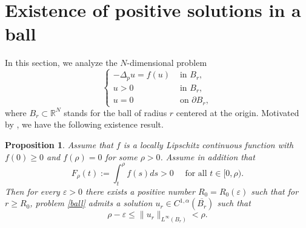 \documentclass[reqno]{amsart}
\theoremstyle{plain}
\newtheorem{proposition}[theorem]{Proposition}
\theoremstyle{definition}
\theoremstyle{remark}
\begin{document}
	\section{Existence of positive solutions in a ball}\label{sect4}
	In this section, we analyze the $N$-dimensional problem
	\begin{equation}\label{ball}
		\begin{cases}
			-\Delta_p u = f(u) &\text{ in } B_r,\\
			u > 0 &\text{ in } B_r,\\
			u = 0 &\text{ on } \partial B_r,
		\end{cases}
	\end{equation}
	where $B_r \subset \mathbb{R}^N $ stands for the ball of radius $r$ centered at the origin. Motivated by \cite{MR937538,MR2822222,MR3058211}, we have the following existence result.
	\begin{proposition}\label{prop:ball}
		Assume that $f$ is a locally Lipschitz continuous function with $f (0) \ge 0$ and $f(\rho) = 0$ for some $\rho > 0$. Assume in addition that
		\[
		F_\rho(t):=\int_{t}^{\rho} f(s) ds > 0 \quad\text{ for all } t \in [0, \rho).
		\]
		Then for every $\varepsilon > 0$ there exists a positive number
		$R_0 = R_0(\varepsilon)$ such that for $r \ge R_0$, problem \eqref{ball} admits a solution $u_r \in C^{1,\alpha}(\overline{B_r})$ such that
		\[
		\rho - \varepsilon \le \|u_r\|_{L^\infty(B_r)} < \rho.
		\]
	\end{proposition}
\end{document}
